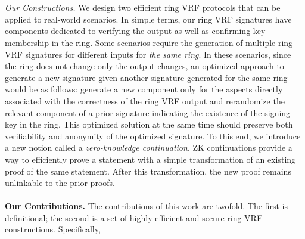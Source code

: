 \\\\
\emph{Our Constructions.}
 We design two efficient ring VRF protocols that can be applied to real-world scenarios.
In simple terms,  our ring VRF signatures have components dedicated to verifying the output as well as confirming key membership in the ring. Some scenarios require the generation of multiple ring VRF signatures for different inputs for \emph{the same ring}. In these scenarios,  since the ring does not change only the output changes, an optimized approach to generate a new signature given another signature generated for the same ring would be as follows:  generate a new component only for the aspects directly associated with the correctness of the ring VRF output and  rerandomize the relevant component of a prior signature indicating the existence of the signing key in the ring. This optimized solution at the same time should preserve both verifiability and anonymity of the optimized signature.
To this end, we introduce a  new notion called  a \emph{zero-knowledge continuation}. ZK continuations provide a way to efficiently prove a statement with a simple transformation of an existing proof of the same statement. After this transformation, the new proof remains unlinkable to the prior proofs. 
\\\\
\noindent \textbf{Our Contributions.} The contributions of this work are twofold.  The first is definitional; the second is a set of highly efficient and secure ring VRF constructions.  Specifically,

